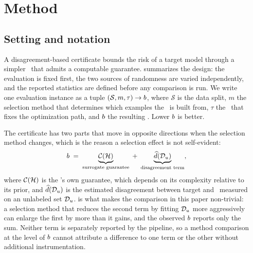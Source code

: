 \section{Method}
\label{sec:method}


\subsection{Setting and notation}
\label{sec:setting}

A disagreement-based certificate bounds the risk of a target model through a
simpler \surrogate\ that admits a computable guarantee.
 summarizes the design: the evaluation is fixed first, the
two sources of randomness are varied independently, and the reported statistics
are defined before any comparison is run. We write one evaluation instance as a
tuple $(\mathcal{S}, m, \tau) \rightarrow b$, where $\mathcal{S}$ is the data
split, $m$ the selection method that determines which examples the \surrogate\
is built from, $\tau$ the \trajseed\ that fixes the optimization path, and
$b$ the resulting \certbound. Lower $b$ is better.

The certificate has two parts that move in opposite directions when the
selection method changes, which is the reason a selection effect is not
self-evident:
\begin{equation}\label{eq:certificate}
  \bnd \;=\; \underbrace{\mathcal{C}(\hypclass)}_{\text{\surrogate\ guarantee}}
  \;+\;
  \underbrace{\widehat{d}(\dataset_u)}_{\text{\disagreement}},
\end{equation}
where $\mathcal{C}(\mathcal{H})$ is the \surrogate's own guarantee, which depends
on its complexity relative to its prior, and $\widehat{d}(\mathcal{D}_u)$ is the
estimated disagreement between target and \surrogate\ measured on an unlabeled
set $\mathcal{D}_u$. \Cref{eq:certificate} is what makes the comparison in this
paper non-trivial: a selection method that reduces the second term by fitting
$\mathcal{D}_u$ more aggressively can enlarge the first by more than it gains, and
the observed $b$ reports only the sum. Neither term is separately reported by
the pipeline, so a method comparison at the level of $b$ cannot attribute a
difference to one term or the other without additional instrumentation.

